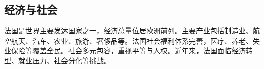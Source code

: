 \subsection{经济与社会}

法国是世界主要发达国家之一，经济总量位居欧洲前列。主要产业包括制造业、航空航天、汽车、农业、旅游、奢侈品等。法国社会福利体系完善，医疗、养老、失业保险等覆盖全民。社会多元包容，重视平等与人权。近年来，法国面临经济转型、就业压力、社会分化等挑战。

